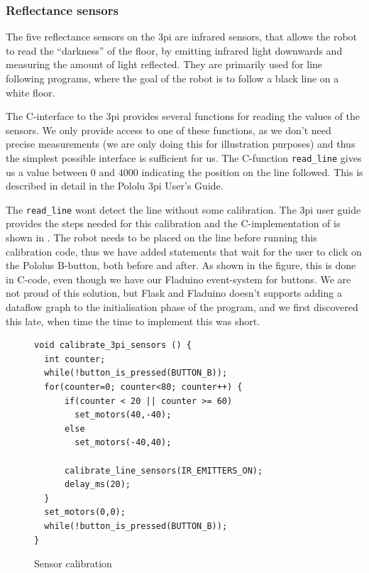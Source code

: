 \documentclass[a4paper, oneside, final]{memoir}
\let\Fref\undefined
\begin{document}
\subsubsection{Reflectance sensors}
The five reflectance sensors on the 3pi are infrared sensors, that
allows the robot to read the ``darkness'' of the floor, by emitting
infrared light downwards and measuring the amount of light
reflected. They are primarily used for line following programs, where
the goal of the robot is to follow a black line on a white floor.

The C-interface to the 3pi provides several functions for reading the
values of the sensors. We only provide access to one of these
functions, as we don't need precise measurements (we are only doing
this for illustration purposes) and thus the simplest possible
interface is sufficient for us. The C-function \verb|read_line| gives us a
value between $0$ and $4000$ indicating the position on the line
followed. This is described in detail in the Pololu 3pi User's
Guide\cite{3pi_users_guide}.

The \verb|read_line| wont detect the line without some
calibration. The 3pi user guide provides the steps needed for this
calibration and the C-implementation of is shown in \Fref{fig:sensor
  calibration}. The robot needs to be placed on the line before
running this calibration code, thus we have added statements that wait
for the user to click on the Pololus B-button, both before and
after. As shown in the figure, this is done in C-code, even though we
have our Fladuino event-system for buttons. We are not proud of this
solution, but Flask and Fladuino doesn't supports adding a dataflow
graph to the initialisation phase of the program, and we first
discovered this late, when time the time to implement this was short.

\begin{figure}
  \centering
\begin{verbatim}
void calibrate_3pi_sensors () {
  int counter;
  while(!button_is_pressed(BUTTON_B));
  for(counter=0; counter<80; counter++) {
      if(counter < 20 || counter >= 60)
        set_motors(40,-40);
      else
        set_motors(-40,40);

      calibrate_line_sensors(IR_EMITTERS_ON);
      delay_ms(20);
  }
  set_motors(0,0);
  while(!button_is_pressed(BUTTON_B));
}
\end{verbatim}
  \caption{Sensor calibration}
  \label{fig:sensor calibration}
\end{figure}
\end{document}
